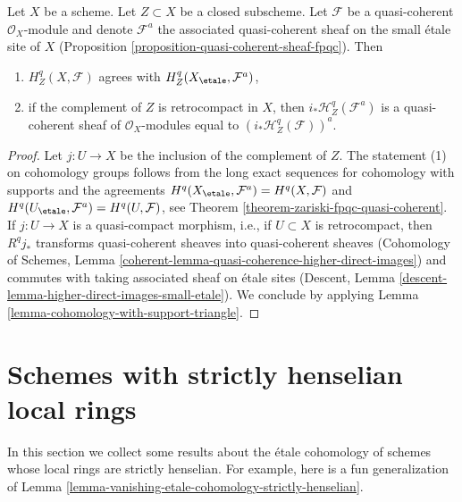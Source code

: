 \begin{lemma}
\label{lemma-cohomology-with-support-quasi-coherent}
Let $X$ be a scheme. Let $Z \subset X$ be a closed subscheme.
Let $\mathcal{F}$ be a quasi-coherent $\mathcal{O}_X$-module
and denote $\mathcal{F}^a$ the associated quasi-coherent sheaf
on the small \'etale site of $X$
(Proposition \ref{proposition-quasi-coherent-sheaf-fpqc}). Then
\begin{enumerate}
\item $H^q_Z(X, \mathcal{F})$ agrees with $H^q_Z(X_\etale, \mathcal{F}^a)$,
\item if the complement of $Z$ is retrocompact in $X$, then
$i_*\mathcal{H}^q_Z(\mathcal{F}^a)$ is a quasi-coherent sheaf of
$\mathcal{O}_X$-modules equal to $(i_*\mathcal{H}^q_Z(\mathcal{F}))^a$.
\end{enumerate}
\end{lemma}

\begin{proof}
Let $j : U \to X$ be the inclusion of the complement of $Z$.
The statement (1) on cohomology groups follows from the long
exact sequences for cohomology with supports and the agreements
$H^q(X_\etale, \mathcal{F}^a) = H^q(X, \mathcal{F})$ and
$H^q(U_\etale, \mathcal{F}^a) = H^q(U, \mathcal{F})$, see
Theorem \ref{theorem-zariski-fpqc-quasi-coherent}.
If $j : U \to X$ is a quasi-compact morphism, i.e., if $U \subset X$
is retrocompact, then $R^qj_*$ transforms quasi-coherent sheaves
into quasi-coherent sheaves
(Cohomology of Schemes, Lemma
\ref{coherent-lemma-quasi-coherence-higher-direct-images})
and commutes with taking associated
sheaf on \'etale sites
(Descent, Lemma \ref{descent-lemma-higher-direct-images-small-etale}).
We conclude by applying
Lemma \ref{lemma-cohomology-with-support-triangle}.
\end{proof}







\section{Schemes with strictly henselian local rings}
\label{section-strictly-henselian-local-rings}

\noindent
In this section we collect some results about the \'etale cohomology
of schemes whose local rings are strictly henselian. For example,
here is a fun generalization of
Lemma \ref{lemma-vanishing-etale-cohomology-strictly-henselian}.

